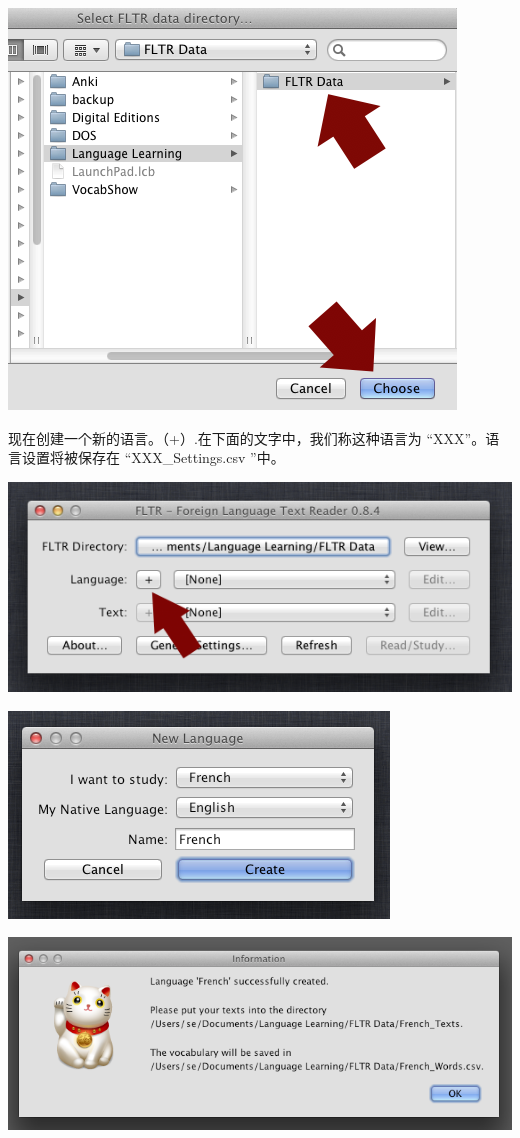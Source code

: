 \documentclass[cn,10pt,math=newtx,citestyle=gb7714-2015,bibstyle=gb7714-2015]{elegantbook}
\begin{document}
\includegraphics[scale=0.6]{image/images-019.png}

现在创建一个新的语言。（+）.在下面的文字中，我们称这种语言为 “XXX”。语言设置将被保存在 “XXX\_Settings.csv ”中。

\includegraphics[scale=0.6]{image/images-021.png}

\includegraphics[scale=0.6]{image/images-023.png}

\includegraphics[scale=0.6]{image/images-024.png}
\end{document}
